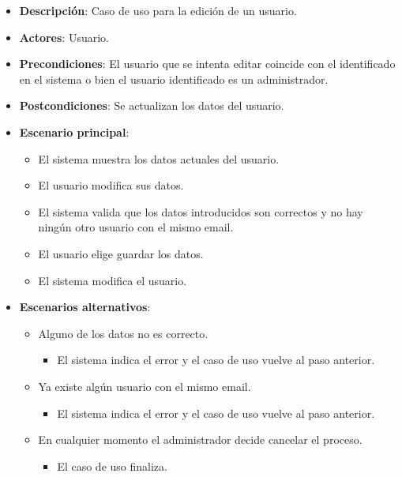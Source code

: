 \documentclass[12pt,a4paperpaper,]{report}
\providecommand{\tightlist}{%
  \setlength{\itemsep}{0pt}\setlength{\parskip}{0pt}}
\begin{document}
\begin{itemize}
\tightlist
\item
  \textbf{Descripción}: Caso de uso para la edición de un usuario.
\item
  \textbf{Actores}: Usuario.
\item
  \textbf{Precondiciones}: El usuario que se intenta editar coincide con
  el identificado en el sistema o bien el usuario identificado es un
  administrador.
\item
  \textbf{Postcondiciones}: Se actualizan los datos del usuario.
\item
  \textbf{Escenario principal}:

  \begin{itemize}
  \tightlist
  \item
    El sistema muestra los datos actuales del usuario.
  \item
    El usuario modifica sus datos.
  \item
    El sistema valida que los datos introducidos son correctos y no hay
    ningún otro usuario con el mismo email.
  \item
    El usuario elige guardar los datos.
  \item
    El sistema modifica el usuario.
  \end{itemize}
\item
  \textbf{Escenarios alternativos}:

  \begin{itemize}
  \tightlist
  \item
    Alguno de los datos no es correcto.

    \begin{itemize}
    \tightlist
    \item
      El sistema indica el error y el caso de uso vuelve al paso
      anterior.
    \end{itemize}
  \item
    Ya existe algún usuario con el mismo email.

    \begin{itemize}
    \tightlist
    \item
      El sistema indica el error y el caso de uso vuelve al paso
      anterior.
    \end{itemize}
  \item
    En cualquier momento el administrador decide cancelar el proceso.

    \begin{itemize}
    \tightlist
    \item
      El caso de uso finaliza.
    \end{itemize}
  \end{itemize}
\end{itemize}
\end{document}
